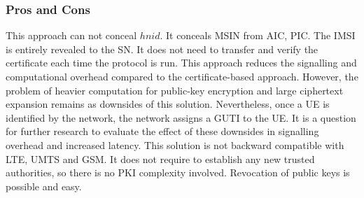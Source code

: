 \documentclass[runningheads,a4paper]{llncs} %
\begin{document}
\subsubsection{Pros and Cons}
This approach can not conceal $hnid$. It conceals MSIN from AIC, PIC. The IMSI is entirely revealed to the SN. It does not need to transfer and verify the certificate each time the protocol is run. This approach reduces the signalling and computational overhead compared to the certificate-based approach. However, the problem of heavier computation for public-key encryption and large ciphertext expansion remains as downsides of this solution.  Nevertheless, once a UE is identified by the network, the network assigns a GUTI to the UE. It is a question for further research to evaluate the effect of these downsides in signalling overhead and increased latency. This solution is not backward compatible with LTE, UMTS and GSM. It does not require to establish any new trusted authorities, so there is no PKI complexity involved. Revocation of public keys is possible and easy.
\end{document}

